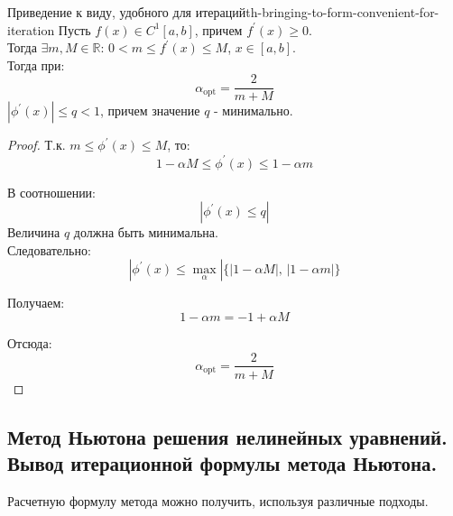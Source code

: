 \documentclass[14pt]{extarticle}
\begin{document}
        \begin{theorem}{Приведение к виду, удобного для итераций}{th-bringing-to-form-convenient-for-iteration}
            Пусть $f(x) \in C^{1}[a, b]$, причем $f^{'}(x) \geq 0$.\\ 
            Тогда $\exists m, M \in \mathbb{R} \text{: } 0 < m \leq f^{'}(x) \leq M$, $x \in [a, b]$.\\
            Тогда при:
            $$\alpha_{\text{opt}} = \frac{2}{m + M}$$
            $|\phi^{'}(x)| \leq q < 1$, причем значение $q$ - минимально.


            \begin{proof}
                Т.к. $m \leq \phi^{'}(x) \leq M$, то:
                $$1 - \alpha M \leq \phi^{'}(x) \leq 1 - \alpha m$$

                В соотношении:
                $$|\phi^{'}(x) \leq q|$$
                Величина $q$ должна быть минимальна.\\

                Следовательно:
                $$|\phi^{'}(x) \leq \max_{\alpha}|\{|1 - \alpha M| \text{, } |1 - \alpha m|\}$$

                Получаем:
                $$1 - \alpha m = -1 + \alpha M$$

                Отсюда:
                $$\alpha_{\text{opt}} = \frac{2}{m + M}$$
            \end{proof}
        \end{theorem}

\clearpage
\subsection{Метод Ньютона решения нелинейных уравнений. Вывод итерационной формулы метода Ньютона.}

    Расчетную формулу метода можно получить, используя различные подходы. 
\end{document}
